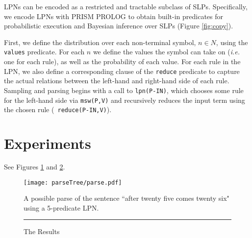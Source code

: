 \documentclass[11pt, twocolumn]{article}
\begin{document}
LPNs can be encoded as a restricted and tractable subclass of
SLPs. Specifically, we encode LPNs with PRISM PROLOG to obtain
built-in predicates for probabilistic execution and Bayesian inference
over SLPs (Figure \ref{fig:copy}).

First, we define the distribution over each non-terminal symbol, $n
\in N$, using the {\tt values} predicate. For each $n$ we define the
values the symbol can take on ({\it i.e.} one for each rule), as well
as the probability of each value. For each rule in the LPN, we also
define a corresponding clause of the {\tt reduce} predicate to capture
the actual relations between the left-hand and right-hand side of each
rule. Sampling and parsing begins with a call to {\tt lpn(P-IN)},
which chooses some rule for the left-hand side via {\tt msw(P,V)} and
recursively reduces the input term using the chosen rule ({\tt
reduce(P-IN,V)}).

\section{Experiments}

See Figures \ref{fig:parseexample} and \ref{fig:results}.

\begin{figure}[t]
		\texttt{[image: parseTree/parse.pdf]}
		\caption{A possible parse of the sentence ``after twenty five comes twenty six" using a 5-predicate LPN.}
                \label{fig:parseexample}
\end{figure}

\begin{figure}
	\rule{\linewidth}{3in}
	\caption{The Results}
	\label{fig:results}
\end{figure}
\end{document}
